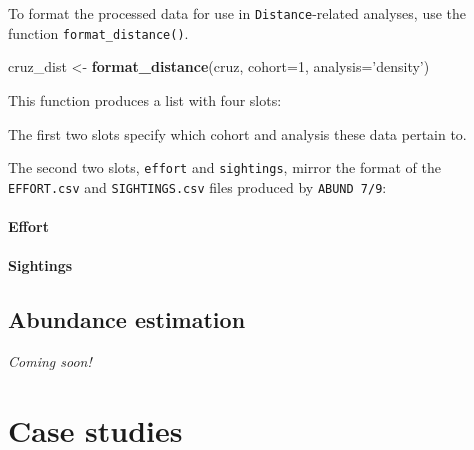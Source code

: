 \documentclass[
]{book}
\newenvironment{Shaded}{\begin{snugshade}}{\end{snugshade}}
\newcommand{\DataTypeTok}[1]{\textcolor[rgb]{0.13,0.29,0.53}{#1}}
\newcommand{\DecValTok}[1]{\textcolor[rgb]{0.00,0.00,0.81}{#1}}
\newcommand{\KeywordTok}[1]{\textcolor[rgb]{0.13,0.29,0.53}{\textbf{#1}}}
\newcommand{\NormalTok}[1]{#1}
\newcommand{\OperatorTok}[1]{\textcolor[rgb]{0.81,0.36,0.00}{\textbf{#1}}}
\newcommand{\StringTok}[1]{\textcolor[rgb]{0.31,0.60,0.02}{#1}}
\begin{document}
To format the processed data for use in \texttt{Distance}-related analyses, use the function \texttt{format\_distance()}.

\begin{Shaded}
\begin{Highlighting}[]
\NormalTok{cruz_dist <-}\StringTok{ }\KeywordTok{format_distance}\NormalTok{(cruz,}
                             \DataTypeTok{cohort=}\DecValTok{1}\NormalTok{,}
                             \DataTypeTok{analysis=}\StringTok{'density'}\NormalTok{)}
\end{Highlighting}
\end{Shaded}

This function produces a list with four slots:

\begin{Shaded}
\end{Shaded}

The first two slots specify which cohort and analysis these data pertain to.

The second two slots, \texttt{effort} and \texttt{sightings}, mirror the format of the \texttt{EFFORT.csv} and \texttt{SIGHTINGS.csv} files produced by \texttt{ABUND\ 7/9}:

\hypertarget{effort}{%
\subsection*{Effort}\label{effort}}

\hypertarget{sightings}{%
\subsection*{Sightings}\label{sightings}}

\hypertarget{abundance}{%
\chapter{Abundance estimation}\label{abundance}}

\emph{Coming soon!}

\hypertarget{part-case-studies}{%
\part{Case studies}\label{part-case-studies}}
\end{document}
